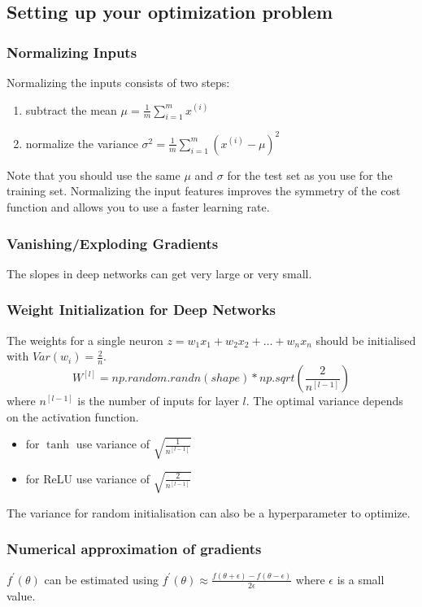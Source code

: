 \documentclass{article}
\begin{document}
\subsection{Setting up your optimization problem}
\subsubsection{Normalizing Inputs}\label{cha:norminputs}
Normalizing the inputs consists of two steps:
\begin{enumerate}
  \item subtract the mean $\mu = \frac{1}{m}\sum_{i=1}^m x^{(i)}$
  \item normalize the variance $\sigma^2=\frac{1}{m}\sum_{i=1}^m(x^{(i)}-\mu)^2$
\end{enumerate}
Note that you should use the same $\mu$ and $\sigma$ for the test set as you use for the training set.
Normalizing the input features improves the symmetry of the cost function and allows you to use a faster learning rate.

\subsubsection{Vanishing/Exploding Gradients}
The slopes in deep networks can get very large or very small.

\subsubsection{Weight Initialization for Deep Networks}
The weights for a single neuron $z=w_1x_1+w_2x_2+\ldots+w_nx_n$ should be initialised with $Var(w_i)=\frac{2}{n}$.
\begin{equation}
  W^{[l]}=np.random.randn(shape)*np.sqrt(\frac{2}{n^{[l-1]}})
\end{equation}
where $n^{[l-1]}$ is the number of inputs for layer $l$.
The optimal variance depends on the activation function.
\begin{itemize}
  \item for $\tanh$ use variance of $\sqrt{\frac{1}{n^{[l-1]}}}$
  \item for ReLU use variance of $\sqrt{\frac{2}{n^{[l-1]}}}$
\end{itemize}
The variance for random initialisation can also be a hyperparameter to optimize.

\subsubsection{Numerical approximation of gradients}
$f^\prime(\theta)$ can be estimated using
$f^\prime(\theta)\approx\frac{f(\theta+\epsilon)-f(\theta-\epsilon)}{2\epsilon}$ where $\epsilon$ is a small value.
\end{document}
